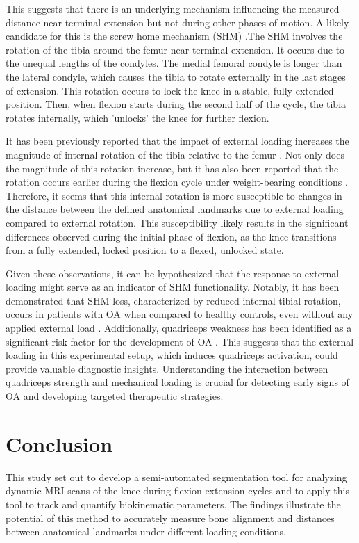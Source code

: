 \documentclass{micro-econ-thesis}
\begin{document}
This suggests that there is an underlying mechanism influencing the measured distance near terminal extension but not during other phases of motion. A likely candidate for this is the screw home mechanism (SHM) \parencite{kim_screw-home_2015}.The SHM involves the rotation of the tibia around the femur near terminal extension. It occurs due to the unequal lengths of the condyles. The medial femoral condyle is longer than the lateral condyle, which causes the tibia to rotate externally in the last stages of extension.   This rotation occurs to lock the knee in a stable, fully extended position. Then, when flexion starts during the second half of the cycle, the tibia rotates internally, which 'unlocks' the knee for further flexion.

It has been previously reported that the impact of external loading increases the magnitude of internal rotation of the tibia relative to the femur \parencite{myers_vivo_2012}. Not only does the magnitude of this rotation increase, but it has also been reported that the rotation occurs earlier during the flexion cycle under weight-bearing conditions \parencite{johal_tibio-femoral_2005}. Therefore, it seems that this internal rotation is more susceptible to changes in the distance between the defined anatomical landmarks due to external loading compared to external rotation. This susceptibility likely results in the significant differences observed during the initial phase of flexion, as the knee transitions from a fully extended, locked position to a flexed, unlocked state.  

Given these observations, it can be hypothesized that the response to external loading might serve as an indicator of SHM functionality. Notably, it has been demonstrated that SHM loss, characterized by reduced internal tibial rotation, occurs in patients with OA when compared to healthy controls, even without any applied external load \parencite{jeon_alteration_2020}. Additionally, quadriceps weakness has been identified as a significant risk factor for the development of OA \parencite{segal_is_2011}. This suggests that the external loading in this experimental setup, which induces quadriceps activation, could provide valuable diagnostic insights. Understanding the interaction between quadriceps strength and mechanical loading is crucial for detecting early signs of OA and developing targeted therapeutic strategies.



 

\section{Conclusion}
\label{sec:conclusion}
This study set out to develop a semi-automated segmentation tool for analyzing dynamic MRI scans of the knee during flexion-extension cycles and to apply this tool to track and quantify biokinematic parameters. The findings illustrate the potential of this method to accurately measure bone alignment and distances between anatomical landmarks under different loading conditions.
\end{document}
